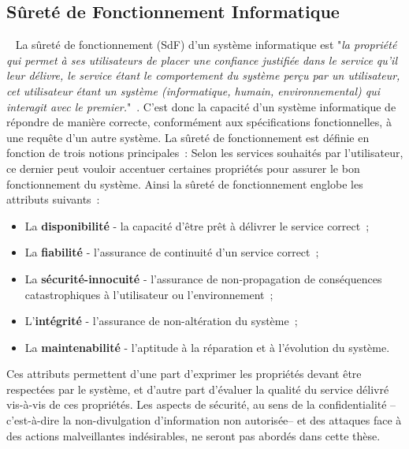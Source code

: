\documentclass[french, a4paper, 11pt, twoside, pdftex]{StyleThese}
\begin{document}
	\subsection{Sûreté de Fonctionnement Informatique}~\label{sec:SureteDeFonctionnement}
		La sûreté de fonctionnement (SdF) d’un système informatique est "\textit{la propriété qui permet à ses utilisateurs de placer une confiance justifiée dans le service qu’il leur délivre, le service étant le comportement du système perçu par un utilisateur, cet utilisateur étant un système (informatique, humain, environnemental) qui interagit avec le premier.}"~\cite{laprie_guide_1996}. C’est donc la capacité d’un système informatique de répondre de manière correcte, conformément aux spécifications fonctionnelles, à une requête d’un autre système.  
		La sûreté de fonctionnement est définie en fonction de trois notions principales~:  
		Selon les services souhaités par l’utilisateur, ce dernier peut vouloir accentuer certaines propriétés pour assurer le bon fonctionnement du système. Ainsi la sûreté de fonctionnement englobe les attributs suivants~:  
		\begin{itemize}
			\item 	La \textbf{disponibilité} - la capacité d’être prêt à délivrer le service correct~; 
			\item 	La \textbf{fiabilité} - l’assurance de continuité d’un service correct~; 
			\item 	La \textbf{sécurité-innocuité} - l’assurance de non-propagation de conséquences catastrophiques à l’utilisateur ou l’environnement~; 
			\item 	L’\textbf{intégrité} - l’assurance de non-altération du système~; 
			\item 	La \textbf{maintenabilité} - l’aptitude à la réparation et à l’évolution du système. 
		\end{itemize} 
		Ces attributs permettent d’une part d’exprimer les propriétés devant être respectées par le système, et d’autre part d’évaluer la qualité du service délivré vis-à-vis de ces propriétés. Les aspects de sécurité, au sens de la confidentialité --c'est-à-dire la non-divulgation d'information non autorisée-- et des attaques face à des actions malveillantes indésirables, ne seront pas abordés dans cette thèse.
\end{document}
